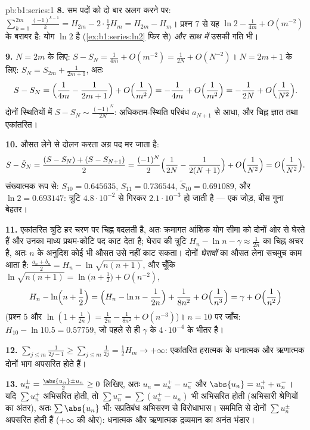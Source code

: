 \begin{solution}{pb:b1:series:1}
\textbf{8.} सम पदों को दो बार अलग करने पर:
$\sum_{k=1}^{2m}\frac{(-1)^{k-1}}{k} = H_{2m} - 2\cdot\frac12 H_m = H_{2m} -
H_m$। प्रश्न 7 से यह $\ln 2 - \frac{1}{4m} + O(m^{-2})$ के बराबर है: योग
$\ln 2$ है (\cref{ex:b1:series:ln2} फिर से) \emph{और साथ में} उसकी गति भी।

\textbf{9.} $N = 2m$ के लिए: $S - S_N = \frac{1}{4m} + O(m^{-2}) =
\frac{1}{2N} + O(N^{-2})$। $N = 2m + 1$ के लिए: $S_{N} = S_{2m} +
\frac{1}{2m+1}$, अतः
\[
S - S_N = \Bigl(\frac{1}{4m} - \frac{1}{2m+1}\Bigr) +
O\Bigl(\frac{1}{m^2}\Bigr)
= -\frac{1}{4m} + O\Bigl(\frac{1}{m^2}\Bigr)
= -\frac{1}{2N} + O\Bigl(\frac{1}{N^2}\Bigr).
\]
दोनों स्थितियों में $S - S_N \sim \frac{(-1)^N}{2N}$: अधिकतम-स्थिति परिबंध
$a_{N+1}$ से आधा, और चिह्न ज्ञात तथा एकांतरित।

\textbf{10.} औसत लेने से दोलन करता अग्र पद मर जाता है:
\[
S - \tilde S_N = \frac{(S - S_N) + (S - S_{N+1})}{2}
= \frac{(-1)^N}{2}\Bigl(\frac{1}{2N} - \frac{1}{2(N+1)}\Bigr)
+ O\Bigl(\frac{1}{N^2}\Bigr) = O\Bigl(\frac{1}{N^2}\Bigr).
\]
संख्यात्मक रूप से: $S_{10} = 0.645635$, $S_{11} = 0.736544$, $\tilde S_{10}
= 0.691089$, और $\ln 2 = 0.693147$: त्रुटि $4.8\cdot10^{-2}$ से गिरकर
$2.1\cdot10^{-3}$ हो जाती है --- एक जोड़, बीस गुना बेहतर।

\textbf{11.} एकांतरित त्रुटि हर चरण पर चिह्न बदलती है, अतः क्रमागत आंशिक योग
सीमा को दोनों ओर से घेरते हैं और उनका माध्य प्रथम-कोटि पद काट देता है; घेराव
की त्रुटि $H_n - \ln n - \gamma \approx \frac{1}{2n}$ का चिह्न अचर है, अतः
$n$ के अनुदिश कोई भी औसत उसे नहीं काट सकता। दोनों \emph{घेरावों} का औसत लेना
सचमुच काम आता है: $\frac{a_n + b_n}{2} = H_n - \ln\sqrt{n(n+1)}$, और चूँकि
$\ln\sqrt{n(n+1)} = \ln\bigl(n + \frac12\bigr) + O(n^{-2})$,
\[
H_n - \ln\Bigl(n + \frac12\Bigr)
= \Bigl(H_n - \ln n - \frac{1}{2n}\Bigr) + \frac{1}{8n^2} +
O\Bigl(\frac{1}{n^3}\Bigr) = \gamma + O\Bigl(\frac{1}{n^2}\Bigr)
\]
(प्रश्न 5 और $\ln(1 + \frac{1}{2n}) = \frac{1}{2n} - \frac{1}{8n^2} +
O(n^{-3})$)। $n = 10$ पर जाँच: $H_{10} - \ln 10.5 = 0.57759$, जो पहले से ही
$\gamma$ के $4\cdot10^{-4}$ के भीतर है।

\textbf{12.} $\sum_{j\leq m} \frac{1}{2j-1} \geq \sum_{j \leq m}
\frac{1}{2j} = \frac12 H_m \to +\infty$: एकांतरित हरात्मक  के धनात्मक
और ऋणात्मक दोनों भाग अपसरित होते हैं।

\textbf{13.} $u_n^\pm = \frac{\abs{u_n} \pm u_n}{2} \geq 0$ लिखिए, अतः $u_n
= u_n^+ - u_n^-$ और $\abs{u_n} = u_n^+ + u_n^-$। यदि $\sum u_n^+$ अभिसरित
होती, तो $\sum u_n^- = \sum (u_n^+ - u_n)$ भी अभिसरित होती (अभिसारी
श्रेणियों का अंतर), अतः $\sum \abs{u_n}$ भी: सप्रतिबंध अभिसरण से विरोधाभास।
सममिति से दोनों $\sum u_n^\pm$ अपसरित होती हैं ($+\infty$ की ओर): धनात्मक और
ऋणात्मक द्रव्यमान का अनंत भंडार।


\end{solution}
